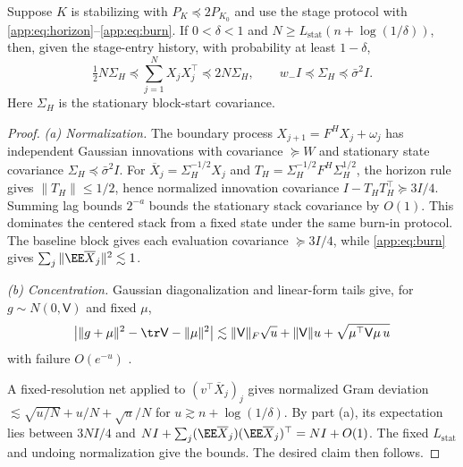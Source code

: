\begin{lemma}\label{app:lem:gram}
Suppose $K$ is stabilizing with $P_K\preceq2P_{K_0}$ and use the
stage protocol with \eqref{app:eq:horizon}--\eqref{app:eq:burn}.
If $0<\delta<1$ and $N\ge L_{\mathrm{stat}}(n+\log(1/\delta))$, then,
given the stage-entry history, with probability at least $1-\delta$,
\[
 \tfrac12N\Sigma_H\preceq\sum_{j=1}^NX_jX_j^\top\preceq2N\Sigma_H,
 \qquad w_-I\preceq\Sigma_H\preceq\bar\sigma^2I .
\]
Here $\Sigma_H$ is the stationary block-start covariance.
\end{lemma}
\begin{proof}
\emph{(a) Normalization.}
The boundary process $X_{j+1}=F^HX_j+\omega_j$ has independent
Gaussian innovations with covariance $\succeq W$ and stationary
state covariance $\Sigma_H\preceq\bar\sigma^2I$.
For $\overline X_j=\Sigma_H^{-1/2}X_j$ and
$T_H=\Sigma_H^{-1/2}F^H\Sigma_H^{1/2}$, the horizon rule gives
$\|T_H\|\le1/2$, hence normalized innovation covariance
$I-T_HT_H^\top\succeq3I/4$.
Summing lag bounds $2^{-a}$ bounds the stationary stack covariance
by $O(1)$. This dominates the centered stack from a fixed state
under the same burn-in protocol.
The baseline block gives each evaluation covariance $\succeq3I/4$,
while \eqref{app:eq:burn} gives
$\sum_j\|\EE\overline X_j\|^2\lesssim1$.

\emph{(b) Concentration.}
Gaussian diagonalization and linear-form tails give, for
$g\sim N(0,\mathsf V)$ and fixed $\mu$,
\[
 \bigl|\|g+\mu\|^2-\tr\mathsf V-\|\mu\|^2\bigr|
 \lesssim \|\mathsf V\|_F\sqrt{u}+\|\mathsf V\|u
                       +\sqrt{\mu^\top\mathsf V\mu\,u}
\]
with failure $O(e^{-u})$ \citep{laurent2000adaptive,rudelson2013hanson}.

A fixed-resolution net applied to $(v^\top\overline X_j)_j$ gives
normalized Gram deviation $\lesssim\sqrt{u/N}+u/N+\sqrt{u}/N$
for $u\gtrsim n+\log(1/\delta)$.
By part (a), its expectation lies between $3NI/4$ and
$NI+\sum_j(\EE\overline X_j)(\EE\overline X_j)^\top=NI+O(1)$.
The fixed $L_{\mathrm{stat}}$ and undoing normalization give the bounds.
The desired claim then follows.
\end{proof}

